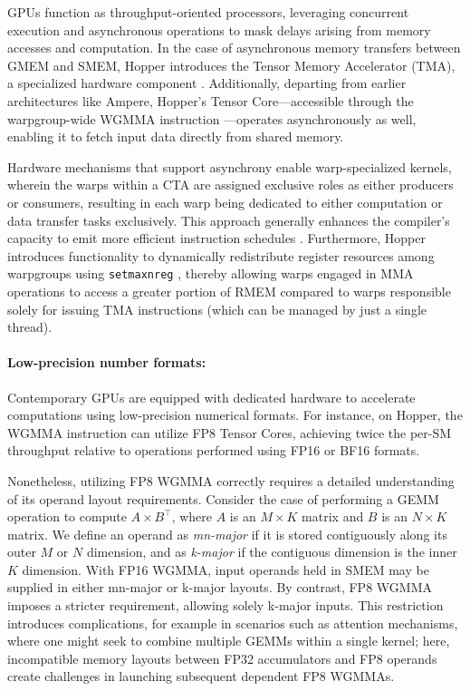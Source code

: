 GPUs function as throughput-oriented processors, leveraging concurrent execution and asynchronous operations to mask delays arising from memory accesses and computation. In the case of asynchronous memory transfers between GMEM and SMEM, Hopper introduces the Tensor Memory Accelerator (TMA), a specialized hardware component \cite[\S7.29]{cuda}. Additionally, departing from earlier architectures like Ampere, Hopper's Tensor Core—accessible through the warpgroup-wide WGMMA instruction \cite[\S9.7.14]{ptx}—operates asynchronously as well, enabling it to fetch input data directly from shared memory.

Hardware mechanisms that support asynchrony enable warp-specialized kernels, wherein the warps within a CTA are assigned exclusive roles as either producers or consumers, resulting in each warp being dedicated to either computation or data transfer tasks exclusively. This approach generally enhances the compiler's capacity to emit more efficient instruction schedules \citep{warp-specialization-2011}. Furthermore, Hopper introduces functionality to dynamically redistribute register resources among warpgroups using \verb|setmaxnreg| \cite[\S9.7.17.1]{ptx}, thereby allowing warps engaged in MMA operations to access a greater portion of RMEM compared to warps responsible solely for issuing TMA instructions (which can be managed by just a single thread).

\paragraph{Low-precision number formats:}
\label{sec:low-precision-gpu}
Contemporary GPUs are equipped with dedicated hardware to accelerate computations using low-precision numerical formats. For instance, on Hopper, the WGMMA instruction can utilize FP8 Tensor Cores, achieving twice the per-SM throughput relative to operations performed using FP16 or BF16 formats.

Nonetheless, utilizing FP8 WGMMA correctly requires a detailed understanding of its operand layout requirements. Consider the case of performing a GEMM operation to compute $A \times B^{\top}$, where $A$ is an $M \times K$ matrix and $B$ is an $N \times K$ matrix. We define an operand as \emph{mn-major} if it is stored contiguously along its outer $M$ or $N$ dimension, and as \emph{k-major} if the contiguous dimension is the inner $K$ dimension. With FP16 WGMMA, input operands held in SMEM may be supplied in either mn-major or k-major layouts. By contrast, FP8 WGMMA imposes a stricter requirement, allowing solely k-major inputs. This restriction introduces complications, for example in scenarios such as attention mechanisms, where one might seek to combine multiple GEMMs within a single kernel; here, incompatible memory layouts between FP32 accumulators and FP8 operands create challenges in launching subsequent dependent FP8 WGMMAs.

